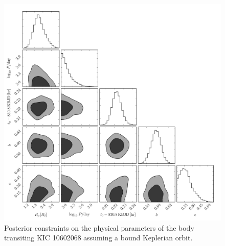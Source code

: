 \documentclass[12pt,preprint]{aastex}
\newcommand{\figlabel}[1]{\label{fig:#1}}
\newcommand{\sectlabel}[1]{\label{sect:#1}}
\begin{document}
\begin{figure}[p]
\begin{center}
\includegraphics[width=\textwidth]{figures/corner.pdf}
\end{center}
\caption{%
Posterior constraints on the physical parameters of the body transiting KIC
10602068 assuming a bound Keplerian orbit.
\figlabel{corner}}
\end{figure}


\end{document}
